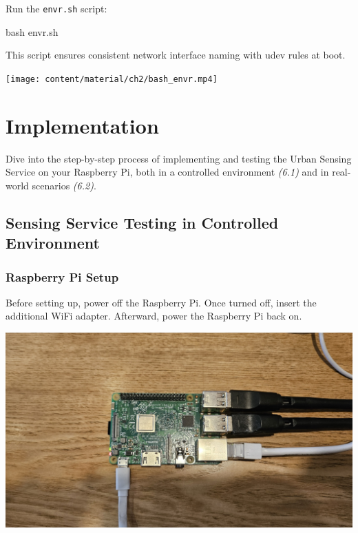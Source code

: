 \documentclass[
  letterpaper,
]{scrbook}
\newenvironment{Shaded}{\begin{snugshade}}{\end{snugshade}}
\newcommand{\FunctionTok}[1]{\textcolor[rgb]{0.28,0.35,0.67}{#1}}
\newcommand{\NormalTok}[1]{\textcolor[rgb]{0.00,0.23,0.31}{#1}}
\begin{document}
Run the \texttt{envr.sh} script:

\begin{Shaded}
\begin{Highlighting}[]
\FunctionTok{bash}\NormalTok{ envr.sh}
\end{Highlighting}
\end{Shaded}

This script ensures consistent network interface naming with udev rules
at boot.

\texttt{[image: content/material/ch2/bash\_envr.mp4]}

\chapter{Implementation}\label{implementation}

Dive into the step-by-step process of implementing and testing the Urban
Sensing Service on your Raspberry Pi, both in a controlled environment
\emph{(6.1)} and in real-world scenarios \emph{(6.2)}.

\section{Sensing Service Testing in Controlled
Environment}\label{sensing-service-testing-in-controlled-environment}

\subsection{Raspberry Pi Setup}\label{raspberry-pi-setup-1}

Before setting up, power off the Raspberry Pi. Once turned off, insert
the additional WiFi adapter. Afterward, power the Raspberry Pi back on.

\includegraphics{content/material/ch2/pi_plugged.jpg}
\end{document}

